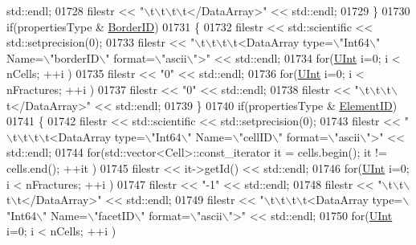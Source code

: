 \begin{DoxyCode}
      std::endl;
01728         filestr << \textcolor{stringliteral}{"\(\backslash\)t\(\backslash\)t\(\backslash\)t\(\backslash\)t</DataArray>"} << std::endl;
01729     \}
01730     \textcolor{keywordflow}{if}(propertiesType & \hyperlink{namespaceFVCode3D_ab3abc77722284ce4344be90bb61c1a41ae672dc66b11cd1f93a00d52d617a1866}{BorderID})
01731     \{
01732         filestr << std::scientific << std::setprecision(0);
01733         filestr << \textcolor{stringliteral}{"\(\backslash\)t\(\backslash\)t\(\backslash\)t\(\backslash\)t<DataArray type=\(\backslash\)"Int64\(\backslash\)" Name=\(\backslash\)"borderID\(\backslash\)" format=\(\backslash\)"ascii\(\backslash\)">"} << std::endl;
01734         \textcolor{keywordflow}{for}(\hyperlink{namespaceFVCode3D_a4bf7e328c75d0fd504050d040ebe9eda}{UInt} i=0; i < nCells; ++i )
01735             filestr << \textcolor{stringliteral}{"0"} << std::endl;
01736         \textcolor{keywordflow}{for}(\hyperlink{namespaceFVCode3D_a4bf7e328c75d0fd504050d040ebe9eda}{UInt} i=0; i < nFractures; ++i )
01737             filestr <<  \textcolor{stringliteral}{"0"} << std::endl;
01738         filestr << \textcolor{stringliteral}{"\(\backslash\)t\(\backslash\)t\(\backslash\)t\(\backslash\)t</DataArray>"} << std::endl;
01739     \}
01740     \textcolor{keywordflow}{if}(propertiesType & \hyperlink{namespaceFVCode3D_ab3abc77722284ce4344be90bb61c1a41a864b9d45a578bf09e82a32916c9c3c03}{ElementID})
01741     \{
01742         filestr << std::scientific << std::setprecision(0);
01743         filestr << \textcolor{stringliteral}{"\(\backslash\)t\(\backslash\)t\(\backslash\)t\(\backslash\)t<DataArray type=\(\backslash\)"Int64\(\backslash\)" Name=\(\backslash\)"cellID\(\backslash\)" format=\(\backslash\)"ascii\(\backslash\)">"} << std::endl;
01744         \textcolor{keywordflow}{for}(std::vector<Cell>::const\_iterator it = cells.begin(); it != cells.end(); ++it )
01745             filestr << it->getId() << std::endl;
01746         \textcolor{keywordflow}{for}(\hyperlink{namespaceFVCode3D_a4bf7e328c75d0fd504050d040ebe9eda}{UInt} i=0; i < nFractures; ++i )
01747             filestr << \textcolor{stringliteral}{"-1"} << std::endl;
01748         filestr << \textcolor{stringliteral}{"\(\backslash\)t\(\backslash\)t\(\backslash\)t\(\backslash\)t</DataArray>"} << std::endl;
01749         filestr << \textcolor{stringliteral}{"\(\backslash\)t\(\backslash\)t\(\backslash\)t\(\backslash\)t<DataArray type=\(\backslash\)"Int64\(\backslash\)" Name=\(\backslash\)"facetID\(\backslash\)" format=\(\backslash\)"ascii\(\backslash\)">"} << std::endl;
01750         \textcolor{keywordflow}{for}(\hyperlink{namespaceFVCode3D_a4bf7e328c75d0fd504050d040ebe9eda}{UInt} i=0; i < nCells; ++i )

\end{DoxyCode}
